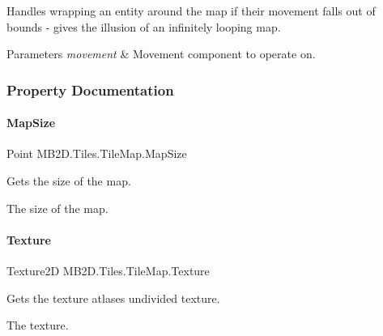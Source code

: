Handles wrapping an entity around the map if their movement falls out of bounds -\/ gives the illusion of an infinitely looping map. 


\begin{DoxyParams}{Parameters}
{\em movement} & Movement component to operate on.\\
\hline
\end{DoxyParams}


\subsubsection{Property Documentation}
\hypertarget{class_m_b2_d_1_1_tiles_1_1_tile_map_a1132945901a5228f1e58d38945b13eeb}{}\label{class_m_b2_d_1_1_tiles_1_1_tile_map_a1132945901a5228f1e58d38945b13eeb} 
\paragraph{\texorpdfstring{Map\+Size}{MapSize}}
{\footnotesize\ttfamily Point M\+B2\+D.\+Tiles.\+Tile\+Map.\+Map\+Size\hspace{0.3cm}{\ttfamily [get]}}



Gets the size of the map. 

The size of the map.\hypertarget{class_m_b2_d_1_1_tiles_1_1_tile_map_a0f5a6cdcd141ab461f7b8bf316e71a9f}{}\label{class_m_b2_d_1_1_tiles_1_1_tile_map_a0f5a6cdcd141ab461f7b8bf316e71a9f} 
\paragraph{\texorpdfstring{Texture}{Texture}}
{\footnotesize\ttfamily Texture2D M\+B2\+D.\+Tiles.\+Tile\+Map.\+Texture\hspace{0.3cm}{\ttfamily [get]}}



Gets the texture atlases undivided texture. 

The texture.\hypertarget{class_m_b2_d_1_1_tiles_1_1_tile_map_a1d25bbc810a7a2664d09d734aada5490}{}\label{class_m_b2_d_1_1_tiles_1_1_tile_map_a1d25bbc810a7a2664d09d734aada5490} 
